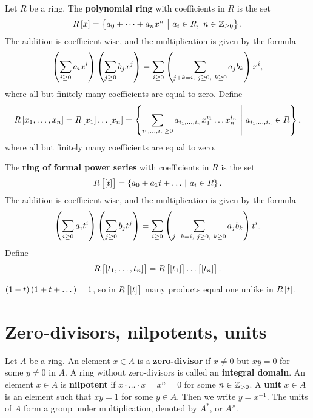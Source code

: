 
\begin{definition}
Let $ R $ be a ring. The \textbf{polynomial ring} with coefficients in $ R $ is the set
$$ R\sbr{x} = \cbr{a_0 + \dots + a_nx^n \st a_i \in R, \ n \in \ZZ_{\ge 0}}. $$
The addition is coefficient-wise, and the multiplication is given by the formula
$$ \br{\sum_{i \ge 0} a_ix^i}\br{\sum_{j \ge 0} b_jx^j} = \sum_{i \ge 0} \br{\sum_{j + k = i, \ j \ge 0, \ k \ge 0} a_jb_k}x^i, $$
where all but finitely many coefficients are equal to zero. Define
$$ R\sbr{x_1, \dots, x_n} = R\sbr{x_1} \dots \sbr{x_n} = \cbr{\sum_{i_1, \dots, i_n \ge 0} a_{i_1, \dots, i_n}x_1^{i_1} \dots x_n^{i_n} \st a_{i_1, \dots, i_n} \in R}, $$
where all but finitely many coefficients are equal to zero.
\end{definition}

\begin{definition}
The \textbf{ring of formal power series} with coefficients in $ R $ is the set
$$ R\sbr{\sbr{t}} = \cbr{a_0 + a_1t + \dots \st a_i \in R}. $$
The addition is coefficient-wise, and the multiplication is given by the formula
$$ \br{\sum_{i \ge 0} a_it^i}\br{\sum_{j \ge 0} b_jt^j} = \sum_{i \ge 0} \br{\sum_{j + k = i, \ j \ge 0, \ k \ge 0} a_jb_k}t^i. $$
Define
$$ R\sbr{\sbr{t_1, \dots, t_n}} = R\sbr{\sbr{t_1}} \dots \sbr{\sbr{t_n}}. $$
\end{definition}

\begin{example*}
$ \br{1 - t}\br{1 + t + \dots} = 1 $, so in $ R\sbr{\sbr{t}} $ many products equal one unlike in $ R\sbr{t} $.
\end{example*}

\section{Zero-divisors, nilpotents, units}

\begin{definition}
Let $ A $ be a ring. An element $ x \in A $ is a \textbf{zero-divisor} if $ x \ne 0 $ but $ xy = 0 $ for some $ y \ne 0 $ in $ A $. A ring without zero-divisors is called an \textbf{integral domain}. An element $ x \in A $ is \textbf{nilpotent} if $ x \cdot \dots \cdot x = x^n = 0 $ for some $ n \in \mathbb{Z}_{> 0} $. A \textbf{unit} $ x \in A $ is an element such that $ xy = 1 $ for some $ y \in A $. Then we write $ y = x^{-1} $. The units of $ A $ form a group under multiplication, denoted by $ A^* $, or $ A^\times $.
\end{definition}

